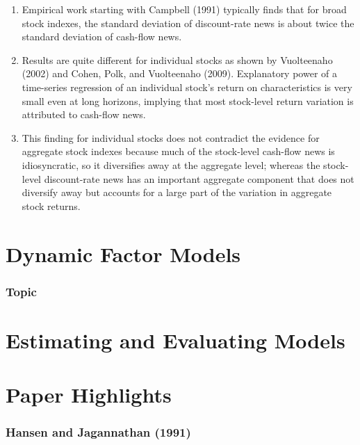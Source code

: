\documentclass[
]{book}
\begin{document}
\begin{enumerate}
\def\labelenumi{\arabic{enumi}.}
\item
  Empirical work starting with Campbell (1991) typically finds that for broad stock indexes, the standard deviation of discount-rate news is about twice the standard deviation of cash-flow news.
\item
  Results are quite different for individual stocks as shown by Vuolteenaho (2002) and Cohen, Polk, and Vuolteenaho (2009). Explanatory power of a time-series regression of an individual stock's return on characteristics is very small even at long horizons, implying that most stock-level return variation is attributed to cash-flow news.
\item
  This finding for individual stocks does not contradict the evidence for aggregate stock indexes because much of the stock-level cash-flow news is idiosyncratic, so it diversifies away at the aggregate level; whereas the stock-level discount-rate news has an important aggregate component that does not diversify away but accounts for a large part of the variation in aggregate stock returns.
\end{enumerate}

\hypertarget{dynamic-factor-models}{%
\chapter{Dynamic Factor Models}\label{dynamic-factor-models}}

\hypertarget{topic}{%
\subsection{Topic}\label{topic}}

\hypertarget{estimating-and-evaluating-models}{%
\chapter{Estimating and Evaluating Models}\label{estimating-and-evaluating-models}}

\hypertarget{paper-highlights}{%
\chapter{Paper Highlights}\label{paper-highlights}}

\hypertarget{hansen-and-jagannathan-1991}{%
\subsection{Hansen and Jagannathan (1991)}\label{hansen-and-jagannathan-1991}}
\end{document}
